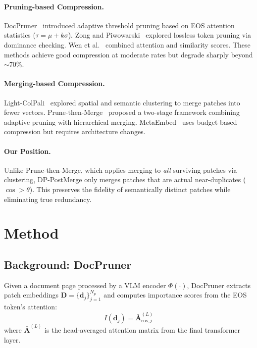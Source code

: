 \documentclass[11pt]{article}
\begin{document}
\paragraph{Pruning-based Compression.}
DocPruner~\cite{yan2025docpruner} introduced adaptive threshold pruning based on EOS attention statistics ($\tau = \mu + k\sigma$).
Zong and Piwowarski~\cite{zong2025lossless} explored lossless token pruning via dominance checking.
Wen et al.~\cite{wen2025token} combined attention and similarity scores.
These methods achieve good compression at moderate rates but degrade sharply beyond $\sim$70\%.

\paragraph{Merging-based Compression.}
Light-ColPali~\cite{ma2025light} explored spatial and semantic clustering to merge patches into fewer vectors.
Prune-then-Merge~\cite{yan2026ptm} proposed a two-stage framework combining adaptive pruning with hierarchical merging.
MetaEmbed~\cite{xiao2025metaembed} uses budget-based compression but requires architecture changes.

\paragraph{Our Position.}
Unlike Prune-then-Merge, which applies merging to \emph{all} surviving patches via clustering, DP-PostMerge only merges patches that are actual near-duplicates ($\cos > \theta$).
This preserves the fidelity of semantically distinct patches while eliminating true redundancy.


\section{Method}

\subsection{Background: DocPruner}

Given a document page processed by a VLM encoder $\Phi(\cdot)$, DocPruner extracts patch embeddings $\mathbf{D} = \{\mathbf{d}_j\}_{j=1}^{N_p}$ and computes importance scores from the EOS token's attention:
\begin{equation}
I(\mathbf{d}_j) = \bar{\mathbf{A}}^{(L)}_{\text{eos}, j}
\end{equation}
where $\bar{\mathbf{A}}^{(L)}$ is the head-averaged attention matrix from the final transformer layer.
\end{document}
